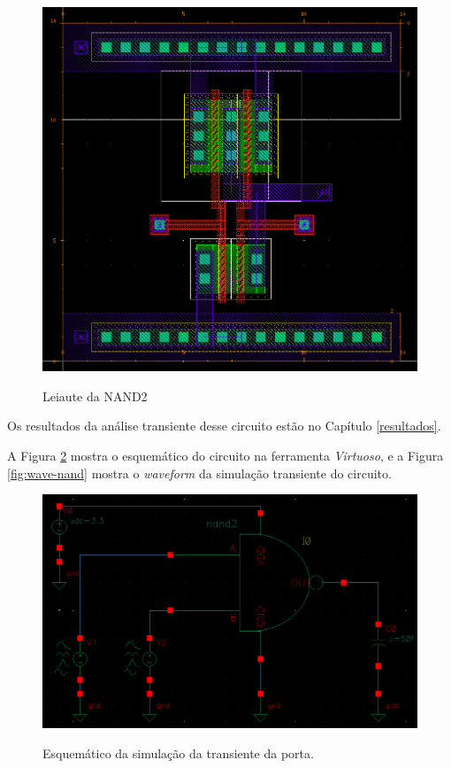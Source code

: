 \documentclass{iiufrgs}
\newcommand{\virtuoso}{\textit{Virtuoso}}
\begin{document}
\begin{figure}[htbp]
    \centering
    \caption{Leiaute da NAND2}
    \includegraphics[scale=0.7]{images/new/layout_nand.png}
    \label{fig:leiaute-nand}
\end{figure}

\FloatBarrier

Os resultados da análise transiente desse circuito estão no Capítulo \ref{resultados}.\

A Figura \ref{fig:trans-nand} mostra o esquemático do circuito na ferramenta \virtuoso, e a Figura \ref{fig:wave-nand} mostra o \textit{waveform} da simulação transiente do circuito.\

\begin{figure}[htbp]
    \centering
    \caption{Esquemático da simulação da transiente da porta.}
    \includegraphics[scale=0.45]{images/new/schem_trans_nand.png}
    \label{fig:trans-nand}
\end{figure}
\end{document}
